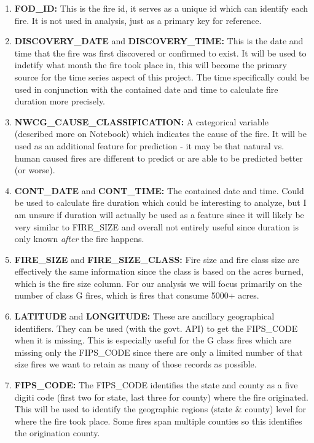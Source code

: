 \documentclass[12pt]{article}
\begin{document}
\begin{enumerate} \item \textbf{FOD\_ID:} This is the fire id, it serves as a unique id which can identify each fire. It is not used in analysis, just as a primary key for reference. 

\item \textbf{DISCOVERY\_DATE} and \textbf{DISCOVERY\_TIME:} This is the date and time that the fire was first discovered or confirmed to exist. It will be used to indetify what month the fire took place in, this will become the primary source for the time series aspect of this project. The time specifically could be used in conjunction with the contained date and time to calculate fire duration more precisely. 

\item \textbf{NWCG\_CAUSE\_CLASSIFICATION:} A categorical variable (described more on Notebook) which indicates the cause of the fire. It will be used as an additional feature for prediction - it may be that natural vs. human caused fires are different to predict or are able to be predicted better (or worse). 

\item \textbf{CONT\_DATE} and \textbf{CONT\_TIME:} The contained date and time. Could be used to calculate fire duration which could be interesting to analyze, but I am unsure if duration will actually be used as a feature since it will likely be very similar to FIRE\_SIZE and overall not entirely useful since duration is only known \textit{after} the fire happens. 

\item \textbf{FIRE\_SIZE} and \textbf{FIRE\_SIZE\_CLASS:} Fire size and fire class size are effectively the same information since the class is based on the acres burned, which is the fire size column. For our analysis we will focus primarily on the number of class G fires, which is fires that consume 5000+ acres. 

\item \textbf{LATITUDE} and \textbf{LONGITUDE:} These are ancillary geographical identifiers. They can be used (with the govt. API) to get the FIPS\_CODE when it is missing. This is especially useful for the G class fires which are missing only the FIPS\_CODE since there are only a limited number of that size fires we want to retain as many of those records as possible. 

\item \textbf{FIPS\_CODE:} The FIPS\_CODE identifies the state and county as a five digiti code (first two for state, last three for county) where the fire originated. This will be used to identify the geographic regions (state \& county) level for where the fire took place. Some fires span multiple counties so this identifies the origination county. 

\end{enumerate}
\end{document}
